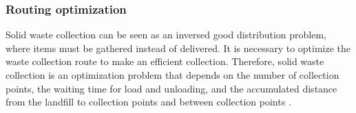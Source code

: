 \documentclass[authoryear,preprint,review,12pt]{elsarticle}
\begin{document}
    \subsubsection{Routing optimization}
    \label{subsubsec:routing}
    Solid waste collection can be seen as an inversed good distribution problem, where items must be gathered instead of delivered. It is necessary to optimize the waste collection route to make an efficient collection. Therefore, solid waste collection is an optimization problem that depends on the number of collection points, the waiting time for load and unloading, and the accumulated distance from the landfill to collection points and between collection points \citep{Sarmah2019}.




\end{document}
